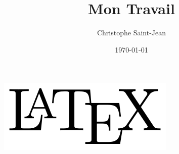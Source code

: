 \documentclass[10pt]{article}
\title{Mon Travail}
\author{Christophe Saint-Jean}
\date{\today}
\begin{document}
\maketitle
\includegraphics{LaTeXLogo.png} %
\end{document}

